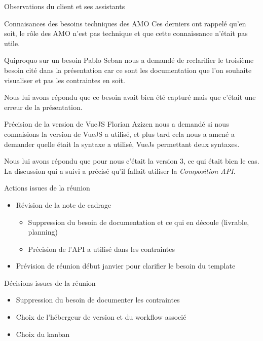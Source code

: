 \documentclass[]{article}
\begin{document}
\begin{section}{Observations du client et ses assistants}
\begin{subsection}{Connaisances des besoins techniques des AMO}
            Ces derniers ont rappelé qu'en soit, le rôle des AMO n'est pas technique et que cette connaissance n'était pas 
            utile.
        \end{subsection}

        \begin{subsection}{Quiproquo sur un besoin}
            Pablo Seban nous a demandé de reclarifier le troisième besoin cité dans la présentation car ce sont les 
            documentation que l'on souhaite visualiser et pas les contraintes en soit.

            Nous lui avons répondu que ce besoin avait bien été capturé mais que c'était une erreur de la présentation.
        \end{subsection}

        \begin{subsection}{Précision de la version de VueJS}
            Florian Azizen nous a demandé si nous connaisions la version de VueJS a utilisé, et plus tard cela nous a amené a
            demander quelle était la syntaxe a utilisé, VueJs permettant deux syntaxes.

            Nous lui avons répondu que pour nous c'était la version 3, ce qui était bien le cas. La discussion qui a suivi a 
            précisé qu'il fallait utiliser la \emph{Composition API}.
        \end{subsection}

    \end{section}

    \begin{section}{Actions issues de la réunion}
        \begin{itemize}
            \item Révision de la note de cadrage
            \begin{itemize}
                \item Suppression du besoin de documentation et ce qui en découle (livrable, planning)
                \item Précision de l'API a utilisé dans les contraintes
            \end{itemize}

            \item Prévision de réunion début janvier pour clarifier le besoin du template
        \end{itemize}
        
    \end{section}

    \begin{section}{Décisions issues de la réunion}
        \begin{itemize}
            \item Suppression du besoin de documenter les contraintes
            \item Choix de l'hébergeur de version et du workflow associé
            \item Choix du kanban
        \end{itemize}
        
    \end{section}
\end{document}
